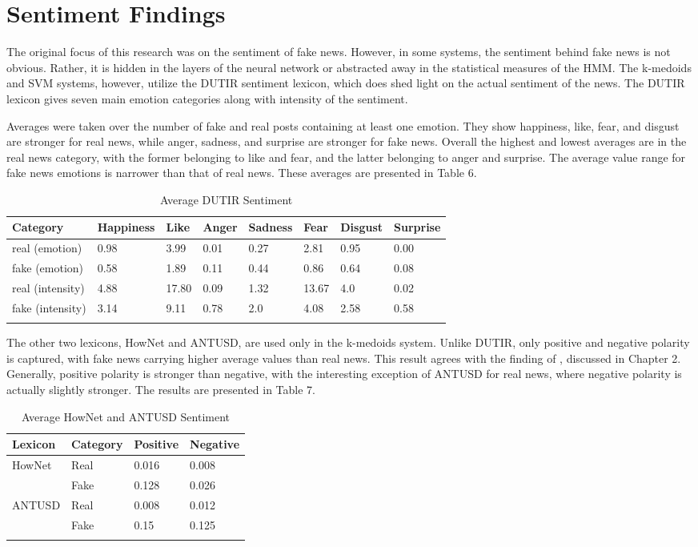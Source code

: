 \documentclass [11pt, proquest] {uwthesis}[2020/02/24]
\begin{document}
\section{Sentiment Findings}
The original focus of this research was on the sentiment of fake news. However, in some systems, the sentiment behind fake news is not obvious. Rather, it is hidden in the layers of the neural network or abstracted away in the statistical measures of the HMM. The k-medoids and SVM systems, however, utilize the DUTIR sentiment lexicon, which does shed light on the actual sentiment of the news. The DUTIR lexicon gives seven main emotion categories along with intensity of the sentiment. 

Averages were taken over the number of fake and real posts containing at least one emotion. They show happiness, like, fear, and disgust are stronger for real news, while anger, sadness, and surprise are stronger for fake news. Overall the highest and lowest averages are in the real news category, with the former belonging to like and fear, and the latter belonging to anger and surprise. The average value range for fake news emotions is narrower than that of real news. These averages are presented in Table 6.

\begin{longtable}{p{3cm}p{2cm}p{1.25cm}p{1.5cm}p{1.75cm}p{1.25cm}p{1.5cm}p{1.5cm}}
 Category&Happiness&Like&Anger&Sadness&Fear&Disgust&Surprise\\
 \hline
real (emotion)&0.98&3.99&0.01&0.27&2.81&0.95&0.00\\
fake (emotion)&0.58&1.89&0.11&0.44&0.86&0.64&0.08\\
real (intensity)&4.88&17.80&0.09&1.32&13.67&4.0&0.02\\
fake (intensity)&3.14&9.11&0.78&2.0&4.08&2.58&0.58\\
\hline
 \caption{Average DUTIR Sentiment}
\end{longtable}

The other two lexicons, HowNet and ANTUSD, are used only in the k-medoids system. Unlike DUTIR, only positive and negative polarity is captured, with fake news carrying higher average values than real news. This result agrees with the finding of \cite{Cui2019}, discussed in Chapter 2. Generally, positive polarity is stronger than negative, with the interesting exception of ANTUSD for real news, where negative polarity is actually slightly stronger. The results are presented in Table 7.

\begin{longtable}
{p{3cm}p{2cm}p{2cm}p{2cm}}
 Lexicon&Category&Positive&Negative\\
 \hline
HowNet&Real&0.016&0.008\\
&Fake&0.128&0.026\\
ANTUSD&Real&0.008&0.012\\
&Fake&0.15&0.125\\
\hline
 \caption{Average HowNet and ANTUSD Sentiment}
\end{longtable}
\end{document}
